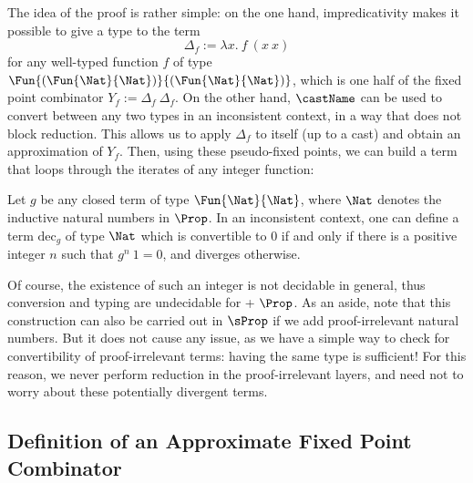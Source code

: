   The idea of the proof is rather simple:
  on the one hand, impredicativity makes it possible to give a type to the term
  \[
  \Delta_f := \lambda x .\ f\ (x\ x)
  \]
  for any well-typed function \( f \) of type \( \Fun{(\Fun{\Nat}{\Nat})}{(\Fun{\Nat}{\Nat})} \), which is one half of the fixed point
  combinator \( Y_f := \Delta_f\ \Delta_f \).
  On the other hand, \( \castName \) can be used to convert between any two types
  in an inconsistent context, in a way that does not block reduction.
  This allows us to apply \( \Delta_f \) to itself (up to a cast) and obtain
  an approximation of \( Y_f \).
  Then, using these pseudo-fixed points, we can build a term that loops through the
  iterates of any integer function:
  \begin{theorem}
    Let \( g \) be any closed term of type \( \Fun{\Nat}{\Nat} \), where \( \Nat \)
    denotes the inductive natural numbers in \( \Prop \).
    In an inconsistent context, one can define a term \( \mathrm{dec}_g \)
    of type \( \Nat \) which is convertible to 0 if and only if there is a positive integer
    \( n \) such that \( g^n\ 1 = 0 \), and diverges otherwise.
  \end{theorem}
  Of course, the existence of such an integer is not decidable in general,
  thus conversion and typing are undecidable for \SetoidCC + \( \Prop \).
  As an aside, note that this construction can also be carried out in
  \( \sProp \) if we add proof-irrelevant natural numbers. But it does
  not cause any issue, as we have a simple way to check for convertibility of
  proof-irrelevant terms: having the same type is sufficient! For this reason,
  we never perform reduction in the proof-irrelevant layers, and need not
  to worry about these potentially divergent terms.
  
  \subsection{Definition of an Approximate Fixed Point Combinator}
  
